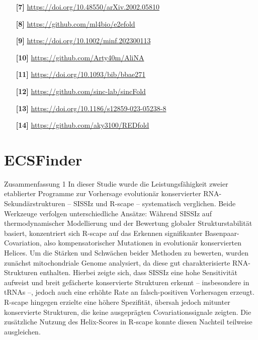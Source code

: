 \documentclass{article}
\begin{document}
\begin{large}
\begin{large}
\begin{large}
\begin{itemize}
    \item[\textbf{[7]}] \url{https://doi.org/10.48550/arXiv.2002.05810} \par
    \item[\textbf{[8]}] \url{https://github.com/ml4bio/e2efold} \par
    
    \item[\textbf{[9]}] \url{https://doi.org/10.1002/minf.202300113} \par
    \item[\textbf{[10]}] \url{https://github.com/Arty40m/AliNA} \par
    
    \item[\textbf{[11]}] \url{https://doi.org/10.1093/bib/bbae271} \par
    \item[\textbf{[12]}] \url{https://github.com/sinc-lab/sincFold} \par
    
    \item[\textbf{[13]}] \url{https://doi.org/10.1186/s12859-023-05238-8} \par
    \item[\textbf{[14]}] \url{https://github.com/aky3100/REDfold} \par
\end{itemize}

\section{ECSFinder}

Zusammenfassung 1
In dieser Studie wurde die Leistungsfähigkeit zweier etablierter Programme zur Vorhersage evolutionär konservierter RNA-Sekundärstrukturen – SISSIz und R-scape – systematisch verglichen. Beide Werkzeuge verfolgen unterschiedliche Ansätze: Während SISSIz auf thermodynamischer Modellierung und der Bewertung globaler Strukturstabilität basiert, konzentriert sich R-scape auf das Erkennen signifikanter Basenpaar-Covariation, also kompensatorischer Mutationen in evolutionär konservierten Helices. Um die Stärken und Schwächen beider Methoden zu bewerten, wurden zunächst mitochondriale Genome analysiert, da diese gut charakterisierte RNA-Strukturen enthalten. Hierbei zeigte sich, dass SISSIz eine hohe Sensitivität aufweist und breit gefächerte konservierte Strukturen erkennt – insbesondere in tRNAs –, jedoch auch eine erhöhte Rate an falsch-positiven Vorhersagen erzeugt. R-scape hingegen erzielte eine höhere Spezifität, übersah jedoch mitunter konservierte Strukturen, die keine ausgeprägten Covariationssignale zeigten. Die zusätzliche Nutzung des Helix-Scores in R-scape konnte diesen Nachteil teilweise ausgleichen.


\end{large}
\end{large}
\end{large}
\end{document}

